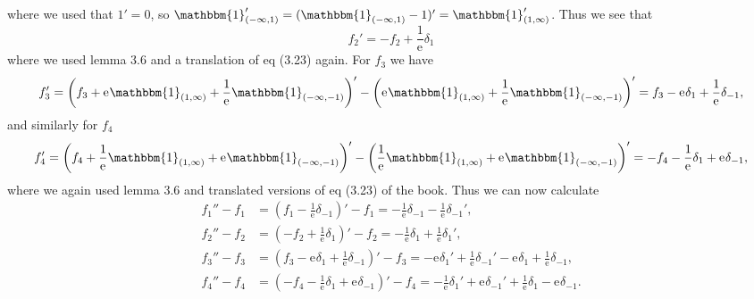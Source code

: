 \documentclass[a4paper,11pt]{article}
\newcommand{\euler}[1]{\text{e}^{#1}}
\numberwithin{equation}{section}
\begin{document}
where we used that $ 1'=0 $, so $ \mathbbm{1}_{(-\infty,1)}'=(\mathbbm{1}_{(-\infty,1)}-1)'=\mathbbm{1}_{(1,\infty)}' $. Thus we see that \begin{equation}
f_2'=-f_2+\frac{1}{\euler{}}\delta_1
\end{equation}
where we used lemma 3.6 and a translation of eq (3.23) again. For $ f_3 $ we have \begin{equation}
\begin{aligned}
f_3'=\left(f_3+\euler{}\mathbbm{1}_{(1,\infty)}+\frac{1}{\euler{}}\mathbbm{1}_{(-\infty,-1)}\right)'-\left(\euler{}\mathbbm{1}_{(1,\infty)}+\frac{1}{\euler{}}\mathbbm{1}_{(-\infty,-1)}\right)'=f_3-\euler{}\delta_1+\frac{1}{\euler{}}\delta_{-1},
\end{aligned}
\end{equation}
and similarly for $ f_4 $
\begin{equation}
\begin{aligned}
f_4'=\left(f_4+\frac{1}{\euler{}}\mathbbm{1}_{(1,\infty)}+\euler{}\mathbbm{1}_{(-\infty,-1)}\right)'-\left(\frac{1}{\euler{}}\mathbbm{1}_{(1,\infty)}+\euler{}\mathbbm{1}_{(-\infty,-1)}\right)'=-f_4-\frac{1}{\euler{}}\delta_1+\euler{}\delta_{-1},
\end{aligned}
\end{equation}
where we again used lemma 3.6 and translated versions of eq (3.23) of the book.
Thus we can now calculate
\begin{equation}\label{LinEqSys}
	\begin{aligned}
	f_1''-f_1&=\left(f_1-\frac{1}{\euler{}}\delta_{-1}\right)'-f_1=-\frac{1}{\euler{}}\delta_{-1}-\frac{1}{\euler{}}\delta_{-1}',\\
	f_2''-f_2&=\left(-f_2+\frac{1}{\euler{}}\delta_{1}\right)'-f_2=-\frac{1}{\euler{}}\delta_1+\frac{1}{\euler{}}\delta_1',\\
	f_3''-f_3&=\left(f_3-\euler{}\delta_1+\frac{1}{\euler{}}\delta_{-1}\right)'-f_3=-\euler{}\delta_1'+\frac{1}{\euler{}}\delta_{-1}'-\euler{}\delta_1+\frac{1}{\euler{}}\delta_{-1},\\
	f_4''-f_4&=\left(-f_4-\frac{1}{\euler{}}\delta_1+\euler{}\delta_{-1}\right)'-f_4=-\frac{1}{\euler{}}\delta_1'+\euler{}\delta_{-1}'+\frac{1}{\euler{}}\delta_1-\euler{}\delta_{-1}.
	\end{aligned}
\end{equation}
%
\end{document}
